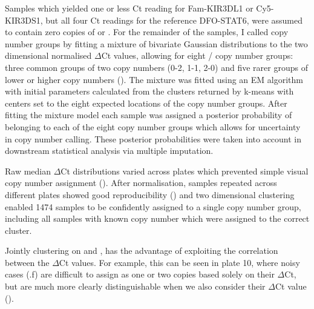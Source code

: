 Samples which yielded one or less Ct reading for Fam-KIR3DL1 or
Cy5-KIR3DS1, but all four Ct readings for the reference DFO-STAT6,
were assumed to contain zero copies of  or
.  For the remainder of the samples, I called copy number groups
by fitting a mixture of bivariate Gaussian distributions to the two
dimensional normalised $\Delta$Ct values, allowing for eight
/ copy number groups: three common groups of two copy
numbers (0-2, 1-1, 2-0) and five
rarer groups of lower or higher copy numbers
().  The mixture was fitted using
an \gls{EM} algorithm \citep{Young:2009ty} with initial parameters
calculated from the clusters returned by k-means with centers set to
the eight expected locations of the copy number groups.
After fitting the mixture model each sample was assigned a posterior
probability of belonging to each of the eight copy number groups which
allows for uncertainty in copy number calling.  These posterior
probabilities were taken into account in downstream statistical
analysis via multiple imputation.

Raw median $\Delta$Ct distributions varied across plates which prevented simple visual copy number assignment ().
After normalisation, samples repeated across different plates showed good reproducibility () and two dimensional clustering enabled 1474 samples to be confidently assigned to a single copy number group, including all samples with known copy number which were assigned to the correct cluster.

Jointly clustering on  and , has the advantage of exploiting the correlation between the $\Delta$Ct values. 
For example, this can be seen in plate 10, where noisy cases (.f) are difficult to assign as one or two copies based solely on their  $\Delta$Ct, but are much more clearly distinguishable when we also consider their  $\Delta$Ct value ().



